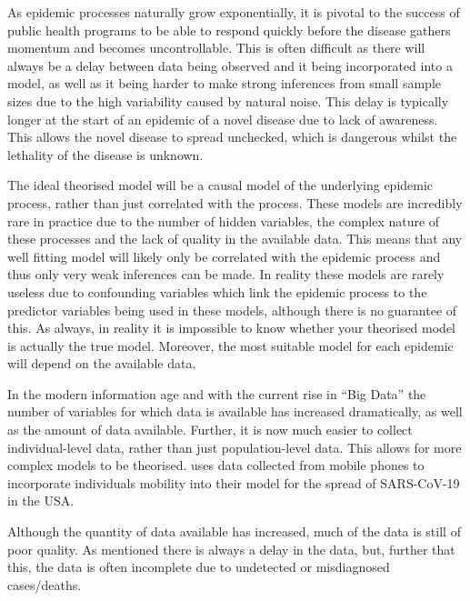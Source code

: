 \documentclass[11pt,a4paper]{article}
\theoremstyle{break}
\begin{document}
  \par As epidemic processes naturally grow exponentially, it is pivotal to the success of public health programs to be able to respond quickly before the disease gathers momentum and becomes uncontrollable. This is often difficult as there will always be a delay between data being observed and it being incorporated into a model, as well as it being harder to make strong inferences from small sample sizes due to the high variability caused by natural noise. This delay is typically longer at the start of an epidemic of a novel disease due to lack of awareness. This allows the novel disease to spread unchecked, which is dangerous whilst the lethality of the disease is unknown.

  \par The ideal theorised model will be a causal model of the underlying epidemic process, rather than just correlated with the process. These models are incredibly rare in practice due to the number of hidden variables, the complex nature of these processes and the lack of quality in the available data. This means that any well fitting model will likely only be correlated with the epidemic process and thus only very weak inferences can be made. In reality these models are rarely useless due to confounding variables which link the epidemic process to the predictor variables being used in these models, although there is no guarantee of this. As always, in reality it is impossible to know whether your theorised model is actually the true model. Moreover, the most suitable model for each epidemic will depend on the available data.

  \par In the modern information age and with the current rise in ``Big Data'' the number of variables for which data is available has increased dramatically, as well as the amount of data available. Further, it is now much easier to collect individual-level data, rather than just population-level data. This allows for more complex models to be theorised. \cite[]{association_between_mobility_patterns_and_covid_19_transmission_in_the_usa} uses data collected from mobile phones to incorporate individuals mobility into their model for the spread of SARS-CoV-19 in the USA.

  \par Although the quantity of data available has increased, much of the data is still of poor quality. As mentioned there is always a delay in the data, but, further that this, the data is often incomplete due to undetected or misdiagnosed cases/deaths.
\end{document}
